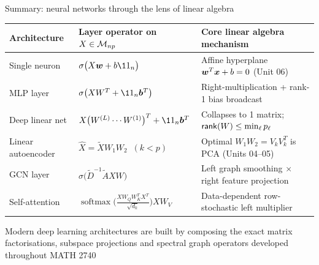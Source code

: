\documentclass[aspectratio=169]{beamer}\usepackage[]{graphicx}\usepackage[]{xcolor}
\begin{document}
\begin{frame}{Summary: neural networks through the lens of linear algebra}
\begin{center}
{\footnotesize
\renewcommand{\arraystretch}{1.35}
\begin{tabular}{lll}
\toprule
\textbf{Architecture} & \textbf{Layer operator on $X \in \mathcal{M}_{np}$} & \textbf{Core linear algebra mechanism} \\
\midrule
Single neuron & $\sigma\big(X\bw + b\11_n\big)$ & Affine hyperplane $\bm{w}^T\bm{x} + b = 0$ (Unit 06) \\
MLP layer & $\sigma\big(X W^T + \11_n \bb^T\big)$ & Right-multiplication + rank-1 bias broadcast \\
Deep linear net & $X \big(W^{(L)}\cdots W^{(1)}\big)^T + \11_n \bb^T$ & Collapses to 1 matrix; $\mathsf{rank}(W) \le \min_\ell p_\ell$ \\
Linear autoencoder & $\hat{X} = \widetilde{X} W_1 W_2 \;\; (k < p)$ & Optimal $W_1 W_2 = V_k V_k^T$ is PCA (Units 04--05) \\
GCN layer & $\sigma\big(\tilde{D}^{-1}\tilde{A} X W\big)$ & Left graph smoothing $\times$ right feature projection \\
Self-attention & $\operatorname{softmax}\!\big(\frac{XW_QW_K^TX^T}{\sqrt{d_k}}\big) X W_V$ & Data-dependent row-stochastic left multiplier \\
\bottomrule
\end{tabular}
}
\end{center}
\vfill
Modern deep learning architectures are built by composing the exact matrix factorisations, subspace projections and spectral graph operators developed throughout MATH 2740
\end{frame}
\end{document}
